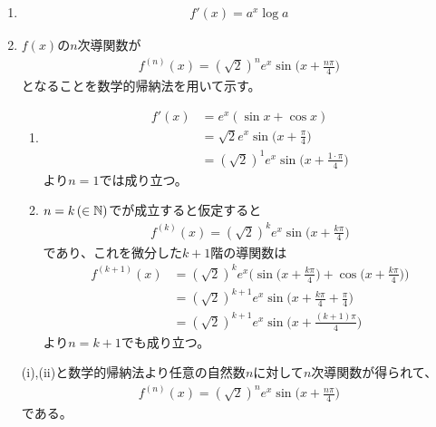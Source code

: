 \begin{ans*}
  ${}$
  \begin{enumerate}[label=(\alph*)]
    \item
    \begin{gather}
      f'(x) = a^x \log a
    \end{gather}
    \item
    $f(x)$の$n$次導関数が
    \begin{gather}
      f^{(n)}(x) = (\sqrt{2})^n e^x\sin\biggl(x + \frac{n\pi}{4}\biggr) \label{eq:2020_spring_goalfnx}
    \end{gather}
    となることを数学的帰納法を用いて示す。
    \begin{enumerate}[label=(\roman*)]
      \item
      \begin{align}
        f'(x)
        &= e^x(\sin x + \cos x) \\
        &= \sqrt{2}e^x \sin\biggl(x + \frac{\pi}{4}\biggr) \\
        &= (\sqrt{2})^{1}e^x \sin\biggl(x + \frac{1\cdot\pi}{4}\biggr)
      \end{align}
      より$n=1$では成り立つ。
      \item $n=k \,(\in \mathbb{N})$でが成立すると仮定すると
      \begin{align}
        f^{(k)}(x) = (\sqrt{2})^k e^x\sin\biggl(x + \frac{k\pi}{4}\biggr)
      \end{align}
      であり、これを微分した$k+1$階の導関数は
      \begin{align}
        f^{(k+1)}(x)
        &= (\sqrt{2})^k e^x\biggl(\sin\biggl(x + \frac{k\pi}{4}\biggr) + \cos\biggl(x + \frac{k\pi}{4}\biggr)\biggr) \\
        &= (\sqrt{2})^{k+1} e^x\sin\biggl(x + \frac{k\pi}{4}+\frac{\pi}{4}\biggr) \\
        &= (\sqrt{2})^{k+1} e^x\sin\biggl(x + \frac{(k+1)\pi}{4}\biggr)
      \end{align}
      より$n=k+1$でも成り立つ。
    \end{enumerate}
    (i),(ii)と数学的帰納法より任意の自然数$n$に対して$n$次導関数が得られて、
    \begin{gather}
      f^{(n)}(x) = (\sqrt{2})^n e^x\sin\biggl(x + \frac{n\pi}{4}\biggr)
    \end{gather}
    である。
  \end{enumerate}

\end{ans*}

